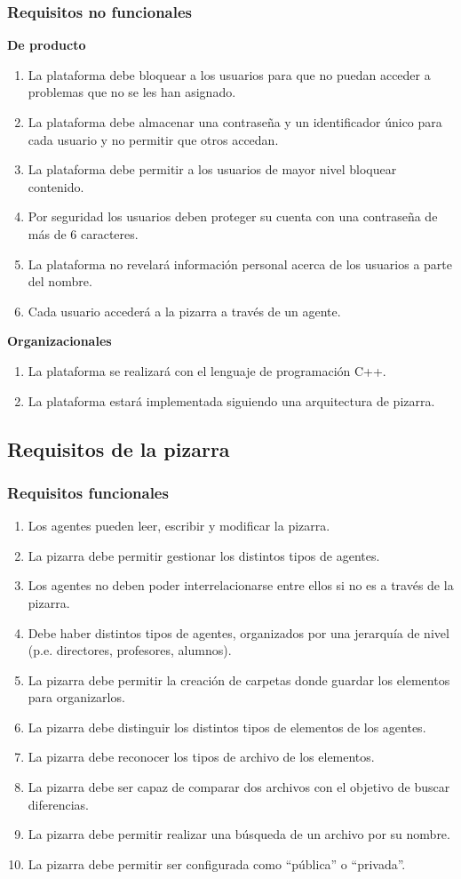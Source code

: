 \subsubsection{Requisitos no funcionales}
\textbf{De producto}
	\begin{enumerate}
		\item La plataforma debe bloquear a los usuarios para que no puedan acceder a problemas que no se les han asignado.
		\item La plataforma debe almacenar una contraseña y un identificador único para cada usuario y no permitir que otros accedan.
		\item La plataforma debe permitir a los usuarios de mayor nivel bloquear contenido.
		\item Por seguridad los usuarios deben proteger su cuenta con una contraseña de más de 6 caracteres.
		\item La plataforma no revelará información personal acerca de los usuarios a parte del nombre.
		\item Cada usuario accederá a la pizarra a través de un agente.
	\end{enumerate}
\textbf{Organizacionales}
	\begin{enumerate}
		\item La plataforma se realizará con el lenguaje de programación C++.
		\item La plataforma estará implementada siguiendo una arquitectura de pizarra.
	\end{enumerate}

\subsection{Requisitos de la pizarra}
\subsubsection{Requisitos funcionales}
	\begin{enumerate}
		\item Los agentes pueden leer, escribir y modificar la pizarra.
		\item La pizarra debe permitir gestionar los distintos tipos de agentes.
		\item Los agentes no deben poder interrelacionarse entre ellos si no es a través de la pizarra.
		\item Debe haber distintos tipos de agentes, organizados por una jerarquía de nivel (p.e. directores, profesores, alumnos).
		\item La pizarra debe permitir la creación de carpetas donde guardar los elementos para organizarlos.
		\item La pizarra debe distinguir los distintos tipos de elementos de los agentes.
		\item La pizarra debe reconocer los tipos de archivo de los elementos.
		\item La pizarra debe ser capaz de comparar dos archivos con el objetivo de buscar diferencias.
		\item La pizarra debe permitir realizar una búsqueda de un archivo por su nombre.
		\item La pizarra debe permitir ser configurada como ``pública'' o ``privada''.
	\end{enumerate}

